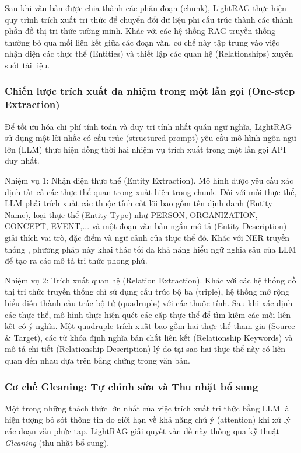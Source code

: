 \indent Sau khi văn bản được chia thành các phân đoạn (chunk), LightRAG thực hiện quy trình trích xuất tri thức để chuyển đổi dữ liệu phi cấu trúc thành các thành phần đồ thị tri thức tường minh. Khác với các hệ thống RAG truyền thống thường bỏ qua mối liên kết giữa các đoạn văn, cơ chế này tập trung vào việc nhận diện các thực thể (Entities) và thiết lập các quan hệ (Relationships) xuyên suốt tài liệu.

\subsubsection{Chiến lược trích xuất đa nhiệm trong một lần gọi (One-step Extraction)}

\indent Để tối ưu hóa chi phí tính toán và duy trì tính nhất quán ngữ nghĩa, LightRAG sử dụng một lời nhắc có cấu trúc (structured prompt) yêu cầu mô hình ngôn ngữ lớn (LLM) thực hiện đồng thời hai nhiệm vụ trích xuất trong một lần gọi API duy nhất. 

\indent Nhiệm vụ 1: Nhận diện thực thể (Entity Extraction). Mô hình được yêu cầu xác định tất cả các thực thể quan trọng xuất hiện trong chunk. Đối với mỗi thực thể, LLM phải trích xuất các thuộc tính cốt lõi bao gồm tên định danh (Entity Name), loại thực thể (Entity Type) như PERSON, ORGANIZATION, CONCEPT, EVENT,... và một đoạn văn bản ngắn mô tả (Entity Description) giải thích vai trò, đặc điểm và ngữ cảnh của thực thể đó. Khác với NER truyền thống \cite{ner_survey}, phương pháp này khai thác tối đa khả năng hiểu ngữ nghĩa sâu của LLM để tạo ra các mô tả tri thức phong phú.

\indent Nhiệm vụ 2: Trích xuất quan hệ (Relation Extraction). Khác với các hệ thống đồ thị tri thức truyền thống chỉ sử dụng cấu trúc bộ ba (triple), hệ thống mở rộng biểu diễn thành cấu trúc bộ tứ (quadruple) với các thuộc tính. Sau khi xác định các thực thể, mô hình thực hiện quét các cặp thực thể để tìm kiếm các mối liên kết có ý nghĩa. Một quadruple trích xuất bao gồm hai thực thể tham gia (Source \& Target), các từ khóa định nghĩa bản chất liên kết (Relationship Keywords) và mô tả chi tiết (Relationship Description) lý do tại sao hai thực thể này có liên quan đến nhau dựa trên bằng chứng trong văn bản.

\subsubsection{Cơ chế Gleaning: Tự chỉnh sửa và Thu nhặt bổ sung}

\indent Một trong những thách thức lớn nhất của việc trích xuất tri thức bằng LLM là hiện tượng bỏ sót thông tin do giới hạn về khả năng chú ý (attention) khi xử lý các đoạn văn phức tạp. LightRAG giải quyết vấn đề này thông qua kỹ thuật \textit{Gleaning} (thu nhặt bổ sung).

